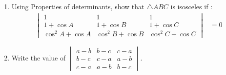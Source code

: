 \documentclass[12pt,-letter paper]{article}
\theoremstyle{remark}
\newcommand{\mydet}[1]{\ensuremath{\begin{vmatrix}#1\end{vmatrix}}}
\begin{document}
\begin{enumerate}
      \item Using Properties of determinants, show that $\triangle ABC$ is isosceles if :
            \begin{align*}
                  \mydet{
                  1                 & 1                 & 1                       \\
                  1+\cos A          & 1+ \cos B         & 1+ \cos C               \\
                  \cos^2 A + \cos A & \cos^2 B + \cos B & \cos^2 C + \cos C} & =0
            \end{align*}
      \item Write the value of
            \mydet{a-b & b-c & c-a \\
                  b-c & c-a & a-b\\
                  c-a & a-b & b-c
            }.

\end{enumerate}
\end{document}
